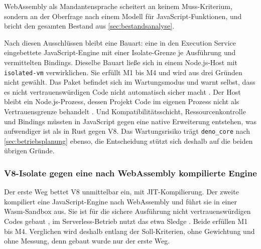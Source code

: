 WebAssembly als Mandantensprache scheitert an keinem Muss-Kriterium, sondern an der Oberfrage nach einem Modell für
JavaScript-Funktionen, und bricht den gesamten Bestand aus \autoref{sec:bestandsanalyse}.

Nach diesen Ausschlüssen bleibt eine Bauart: eine in den Execution Service eingebettete JavaScript-Engine mit einer
Isolate-Grenze je Ausführung und vermittelten Bindings. Dieselbe Bauart ließe sich in einem Node.js-Host mit
\texttt{isolated-vm} verwirklichen. Sie erfüllt M1 bis M4 und wird aus drei Gründen nicht gewählt. Das
Paket befindet sich im Wartungsmodus und warnt selbst, dass es nicht vertrauenswürdigen Code nicht automatisch sicher
macht \autocite{laverdet_isolated-vm_2026}. Der Host bleibt ein Node.js-Prozess, dessen Projekt Code im eigenen Prozess
nicht als Vertrauensgrenze behandelt \autocite{the_nodejs_project_security_2026}. Und Kompatibilitätsschicht,
Ressourcenkontrolle und Bindings müssten in JavaScript gegen eine native Erweiterung entstehen, was aufwendiger ist
als in Rust gegen V8. Das Wartungsrisiko trägt \texttt{deno\_core} nach \autoref{sec:betriebsplanung} ebenso, die
Entscheidung stützt sich deshalb auf die beiden übrigen Gründe.

\subsubsection{V8-Isolate gegen eine nach WebAssembly kompilierte Engine}
\label{sec:wasm-zurueckgestellt}

Der erste Weg bettet V8 unmittelbar ein, mit \ac{JIT}-Kompilierung. Der zweite kompiliert eine JavaScript-Engine nach
WebAssembly und führt sie in einer Wasm-Sandbox aus. Sie ist für die sichere Ausführung nicht vertrauenswürdigen Codes gebaut
\autocite{bytecode_alliance_security_2026}, im Serverless-Betrieb nutzt das etwa Sledge \autocite[S.~265]{gadepalli_sledge_2020}.
Beide erfüllen M1 bis M4. Verglichen wird deshalb entlang der
Soll-Kriterien, ohne Gewichtung und ohne Messung, denn gebaut wurde nur der erste Weg.

